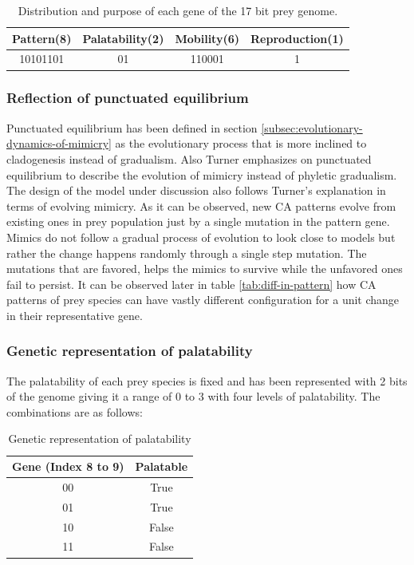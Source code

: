 \documentclass[letterpaper]{article}
\numberwithin{equation}{section}
\begin{document}
\begin{table}[H]
\centering
\setlength\tabcolsep{2pt}
\begin{tabular}{|c|c|c|c|}
	\hline
		\textbf{Pattern(8)} & \textbf{Palatability(2)} & \textbf{Mobility(6)} & \textbf{Reproduction(1)} \\ \hline
		10101101					 	& 							01		 		 & 			110001					&					1						 		 \\ \hline
\end{tabular}
\caption{Distribution and purpose of each gene of the 17 bit prey genome.}
\label{tab:prey-genome}
\end{table}

\subsubsection{Reflection of punctuated equilibrium}
\label{subsubsec:reflection-of-punctuated-equilibrium}
Punctuated equilibrium has been defined in section \ref{subsec:evolutionary-dynamics-of-mimicry} as the evolutionary process that is more inclined to cladogenesis instead of gradualism. Also Turner \cite{turner1988} emphasizes on punctuated equilibrium to describe the evolution of mimicry instead of phyletic gradualism. The design of the model under discussion also follows Turner's explanation in terms of evolving mimicry. As it can be observed, new CA patterns evolve from existing ones in prey population just by a single mutation in the pattern gene. Mimics do not follow a gradual process of evolution to look close to models but rather the change happens randomly through a single step mutation. The mutations that are favored, helps the mimics to survive while the unfavored ones fail to persist. It can be observed later in table \ref{tab:diff-in-pattern} how CA patterns of prey species can have vastly different configuration for a unit change in their representative gene. 

\subsubsection{Genetic representation of palatability}
\label{subsubsec:genetic-palatability-representation}
The palatability of each prey species is fixed and has been represented with 2 bits of the genome giving it a range of 0 to 3 with four levels of palatability. The combinations are as follows:

\begin{table}[h]
	\centering
	\begin{tabular}{|c|c|}
		\hline
			\textbf{Gene (Index 8 to 9)} &	\textbf{Palatable} \\ \hline
			00									& True 			\\ \hline
			01									& True 			\\ \hline
			10									& False 		\\ \hline
			11									& False 		\\
		\hline
	\end{tabular}
	\caption{Genetic representation of palatability}
	\label{tab:genetic-representation-palatability}
\end{table}
\end{document}
